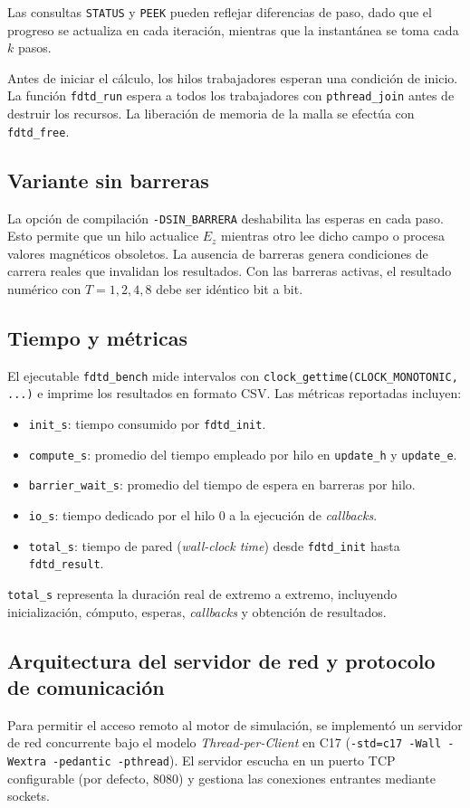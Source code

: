 \documentclass[12pt,a4paper]{article}
\begin{document}
Las consultas \texttt{STATUS} y \texttt{PEEK} pueden reflejar diferencias de paso, dado que el progreso se actualiza en cada iteración, mientras que la instantánea se toma cada $k$ pasos.

Antes de iniciar el cálculo, los hilos trabajadores esperan una condición de inicio. La función \texttt{fdtd\_run} espera a todos los trabajadores con \texttt{pthread\_join} antes de destruir los recursos. La liberación de memoria de la malla se efectúa con \texttt{fdtd\_free}.

\subsection{Variante sin barreras}
La opción de compilación \texttt{-DSIN\_BARRERA} deshabilita las esperas en cada paso. Esto permite que un hilo actualice $E_z$ mientras otro lee dicho campo o procesa valores magnéticos obsoletos. La ausencia de barreras genera condiciones de carrera reales que invalidan los resultados. Con las barreras activas, el resultado numérico con $T=1,2,4,8$ debe ser idéntico bit a bit.

\subsection{Tiempo y métricas}
El ejecutable \texttt{fdtd\_bench} mide intervalos con \texttt{clock\_gettime(CLOCK\_MONOTONIC, ...)} e imprime los resultados en formato CSV. Las métricas reportadas incluyen:
\begin{itemize}
\item \texttt{init\_s}: tiempo consumido por \texttt{fdtd\_init}.
\item \texttt{compute\_s}: promedio del tiempo empleado por hilo en \texttt{update\_h} y \texttt{update\_e}.
\item \texttt{barrier\_wait\_s}: promedio del tiempo de espera en barreras por hilo.
\item \texttt{io\_s}: tiempo dedicado por el hilo 0 a la ejecución de \textit{callbacks}.
\item \texttt{total\_s}: tiempo de pared (\textit{wall-clock time}) desde \texttt{fdtd\_init} hasta \texttt{fdtd\_result}.
\end{itemize}

\texttt{total\_s} representa la duración real de extremo a extremo, incluyendo inicialización, cómputo, esperas, \textit{callbacks} y obtención de resultados.

\subsection{Arquitectura del servidor de red y protocolo de comunicación}
Para permitir el acceso remoto al motor de simulación, se implementó un servidor de red concurrente bajo el modelo \textit{Thread-per-Client} en C17 (\texttt{-std=c17 -Wall -Wextra -pedantic -pthread}). El servidor escucha en un puerto TCP configurable (por defecto, 8080) y gestiona las conexiones entrantes mediante sockets.
\end{document}
